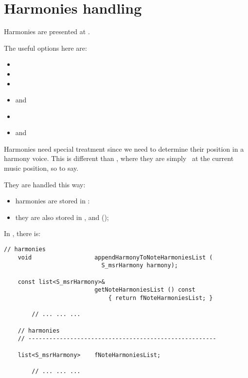 
\chapter{Harmonies handling}\label{Harmonies handling}

Harmonies are presented at .

The useful options here are:
\begin{itemize}
\item {}
\item {}
\item {}
\item {} and 
\item {}
\item {} and 
\end{itemize}

Harmonies need special treatment since we need to determine their position in a harmony  voice. This is different than \mxml, where they are simply \drawn\ at the current music position, so to say.

They are handled this way:
\begin{itemize}
\item harmonies are stored in :
\item they are also stored in ,  and  (\denorm);
\end{itemize}

In , there is:
\begin{lstlisting}[language=CPlusPlus]
    // harmonies
    void                  appendHarmonyToNoteHarmoniesList (
                            S_msrHarmony harmony);

    const list<S_msrHarmony>&
                          getNoteHarmoniesList () const
                              { return fNoteHarmoniesList; }

		// ... ... ...

    // harmonies
    // ------------------------------------------------------

    list<S_msrHarmony>    fNoteHarmoniesList;

		// ... ... ...
\end{lstlisting}



